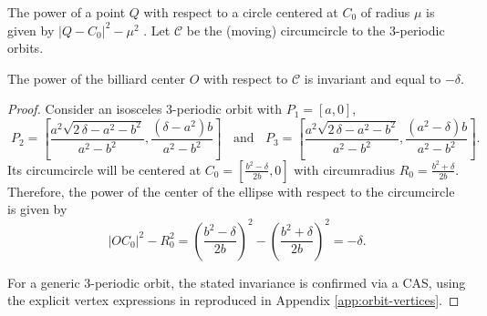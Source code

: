 The power of a point $Q$ with respect to a circle centered at $C_0$ of radius $\mu$ is given by $|Q-C_0|^2-\mu^2$ \cite[Circle Power]{mw}. Let $\mathcal{C}$ be the (moving) circumcircle to the 3-periodic orbits.

\begin{theorem}\label{thm:power_delta}
The power of the billiard center $O$ with respect to $\mathcal{C}$ is invariant and equal to $-\delta$.
\label{thm:delta-power}
\end{theorem}

\begin{proof}
 Consider an isosceles 3-periodic orbit with $P_1=[a,0]$,
 {\small  
 \[  \;  P_2   =\left[\frac {{a}^{2}\sqrt {2\,\delta-{a}^{2}-{b}^{2}}}{{a}^{2}-{b}^{2}},   
	\frac { \left(\delta  -{a}^{2}\right) b}{{a}^{2}-{b}^{2}}\right]\;\;
	 \text{ and  }\;\;  P_3= \left[{\frac {{a}^{2}\sqrt {2\,\delta-{a}^{2}-{b}^{2} }}{{a}^{2}-{b}^{2}}},
	{\frac { \left(  {a}^{2}-\delta \right) b}{{a}^{2}-{b}^{2}}}\right].
	\]
 }%
	Its circumcircle will be centered at $C_0=[ {\frac { {b}^{2}-\delta}{2b}},0]$ with circumradius $R_0=\frac {{b}^{2}+\delta}{2b}.$
	Therefore, the power of the center of the ellipse with respect to the circumcircle is given by  
	$$|OC_0|^2-R_0^2=\left(\frac { {b}^{2}-\delta}{2b}\right)^2 - \left(\frac {{b}^{2}+\delta}{2b}\right)^2=-\delta.$$

For a generic 3-periodic orbit, the stated invariance is confirmed via a CAS, using the explicit vertex expressions in \cite{garcia2019-ellipses} reproduced in Appendix \ref{app:orbit-vertices}.
\end{proof}



 
